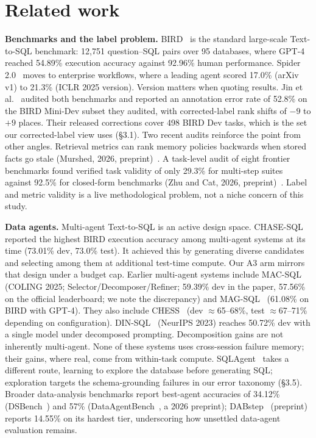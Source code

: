 \documentclass[sigconf, nonacm]{acmart}
\begin{document}
\section{Related work}

\textbf{Benchmarks and the label problem.} BIRD~\cite{bird} is the standard large-scale Text-to-SQL benchmark: 12,751 question--SQL pairs over 95 databases, where GPT-4 reached 54.89\% execution accuracy against 92.96\% human performance. Spider 2.0~\cite{spider2} moves to enterprise workflows, where a leading agent scored 17.0\% (arXiv v1) to 21.3\% (ICLR 2025 version). Version matters when quoting results. Jin et al.~\cite{jin} audited both benchmarks and reported an annotation error rate of 52.8\% on the BIRD Mini-Dev subset they audited, with corrected-label rank shifts of $-9$ to $+9$ places. Their released corrections cover 498 BIRD Dev tasks, which is the set our corrected-label view uses (\S3.1). Two recent audits reinforce the point from other angles. Retrieval metrics can rank memory policies backwards when stored facts go stale (Murshed, 2026, preprint)~\cite{stalebench}. A task-level audit of eight frontier benchmarks found verified task validity of only 29.3\% for multi-step suites against 92.5\% for closed-form benchmarks (Zhu and Cat, 2026, preprint)~\cite{benchmarks}. Label and metric validity is a live methodological problem, not a niche concern of this study.

\textbf{Data agents.} Multi-agent Text-to-SQL is an active design space. CHASE-SQL~\cite{chase} reported the highest BIRD execution accuracy among multi-agent systems at its time (73.01\% dev, 73.0\% test). It achieved this by generating diverse candidates and selecting among them at additional test-time compute. Our A3 arm mirrors that design under a budget cap. Earlier multi-agent systems include MAC-SQL~\cite{macsql} (COLING 2025; Selector/Decomposer/Refiner; 59.39\% dev in the paper, 57.56\% on the official leaderboard; we note the discrepancy) and MAG-SQL~\cite{magsql} (61.08\% on BIRD with GPT-4). They also include CHESS~\cite{chess} (dev $\approx$65--68\%, test $\approx$67--71\% depending on configuration). DIN-SQL~\cite{dinsql} (NeurIPS 2023) reaches 50.72\% dev with a single model under decomposed prompting. Decomposition gains are not inherently multi-agent. None of these systems uses cross-session failure memory; their gains, where real, come from within-task compute. SQLAgent~\cite{sqlagent} takes a different route, learning to explore the database before generating SQL; exploration targets the schema-grounding failures in our error taxonomy (\S3.5). Broader data-analysis benchmarks report best-agent accuracies of 34.12\% (DSBench~\cite{dsbench}) and 57\% (DataAgentBench~\cite{dataagentbench}, a 2026 preprint); DABstep~\cite{dabstep} (preprint) reports 14.55\% on its hardest tier, underscoring how unsettled data-agent evaluation remains.
\end{document}
